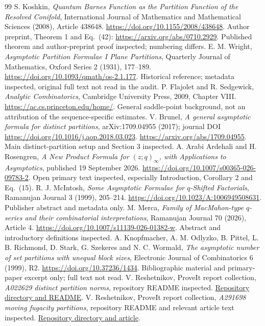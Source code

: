 \documentclass[11pt]{article}
\theoremstyle{remark}\newtheorem{remark}[theorem]{Remark}
\begin{document}
\begin{thebibliography}{99}
 S. Koshkin, \emph{Quantum Barnes Function as the Partition Function of the Resolved Conifold}, International Journal of Mathematics and Mathematical Sciences (2008), Article 438648. \url{https://doi.org/10.1155/2008/438648}. Author preprint, Theorem 1 and Eq.~(42): \url{https://arxiv.org/abs/0710.2929}. Published theorem and author-preprint proof inspected; numbering differs.
 E. M. Wright, \emph{Asymptotic Partition Formulae I Plane Partitions}, Quarterly Journal of Mathematics, Oxford Series 2 (1931), 177--189. \url{https://doi.org/10.1093/qmath/os-2.1.177}. Historical reference; metadata inspected, original full text not read in the audit.
 P. Flajolet and R. Sedgewick, \emph{Analytic Combinatorics}, Cambridge University Press, 2009, Chapter VIII. \url{https://ac.cs.princeton.edu/home/}. General saddle-point background, not an attribution of the sequence-specific estimates.
 V. Brunel, \emph{A general asymptotic formula for distinct partitions}, arXiv:1709.04955 (2017); journal DOI \url{https://doi.org/10.1016/j.aop.2018.03.023}. \url{https://arxiv.org/abs/1709.04955}. Main distinct-partition setup and Section 3 inspected.
 A. Arabi Ardehali and H. Rosengren, \emph{A New Product Formula for $(z;q)_\infty$, with Applications to Asymptotics}, published 19 September 2026. \url{https://doi.org/10.1007/s00365-026-09783-2}. Open primary text inspected, especially Introduction, Corollary 2 and Eq.~(15).
 R. J. McIntosh, \emph{Some Asymptotic Formulae for $q$-Shifted Factorials}, Ramanujan Journal 3 (1999), 205--214. \url{https://doi.org/10.1023/A:1006949508631}. Publisher abstract and metadata only.
 M. Merca, \emph{Family of MacMahon-type $q$-series and their combinatorial interpretations}, Ramanujan Journal 70 (2026), Article 4. \url{https://doi.org/10.1007/s11139-026-01382-w}. Abstract and introductory definitions inspected.
 A. Knopfmacher, A. M. Odlyzko, B. Pittel, L. B. Richmond, D. Stark, G. Szekeres and N. C. Wormald, \emph{The asymptotic number of set partitions with unequal block sizes}, Electronic Journal of Combinatorics 6 (1999), R2. \url{https://doi.org/10.37236/1434}. Bibliographic material and primary-paper excerpt only; full text not read.
 V. Reshetnikov, ProveIt report collection, \emph{A022629 distinct partition norms}, repository README inspected. \href{https://github.com/VladimirReshetnikov/ProveIt/tree/main/SetTheory/Cardinals/docs/reports/generating-functions-and-asymptotics/oeis-sequence-asymptotics/a022629-distinct-partition-norms}{Repository directory and README}.
 V. Reshetnikov, ProveIt report collection, \emph{A291698 moving fugacity partitions}, repository README and relevant article text inspected. \href{https://github.com/VladimirReshetnikov/ProveIt/tree/main/SetTheory/Cardinals/docs/reports/generating-functions-and-asymptotics/oeis-sequence-asymptotics/a291698-moving-fugacity-partitions}{Repository directory and article}.
\end{thebibliography}
\end{document}
